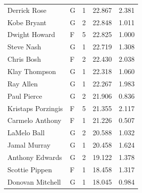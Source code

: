 \begin{table}[t]
\begin{tabular*}{\linewidth}{@{\extracolsep{\fill}}llcrr}
Derrick Rose & G & 1 & 22.867 & 2.381 \\ 
Kobe Bryant & G & 2 & 22.848 & 1.011 \\ 
Dwight Howard & F & 5 & 22.825 & 1.000 \\ 
Steve Nash & G & 1 & 22.719 & 1.308 \\ 
Chris Bosh & F & 2 & 22.430 & 2.038 \\ 
Klay Thompson & G & 1 & 22.318 & 1.060 \\ 
Ray Allen & G & 1 & 22.267 & 1.983 \\ 
Paul Pierce & G & 2 & 21.906 & 0.836 \\ 
Kristaps Porzingis & F & 5 & 21.355 & 2.117 \\ 
Carmelo Anthony & F & 1 & 21.226 & 0.507 \\ 
LaMelo Ball & G & 2 & 20.588 & 1.032 \\ 
Jamal Murray & G & 1 & 20.458 & 1.624 \\ 
Anthony Edwards & G & 2 & 19.122 & 1.378 \\ 
Scottie Pippen & F & 1 & 18.458 & 1.317 \\ 
Donovan Mitchell & G & 1 & 18.045 & 0.984 \\ 
\bottomrule
\end{tabular*}
\end{table}

